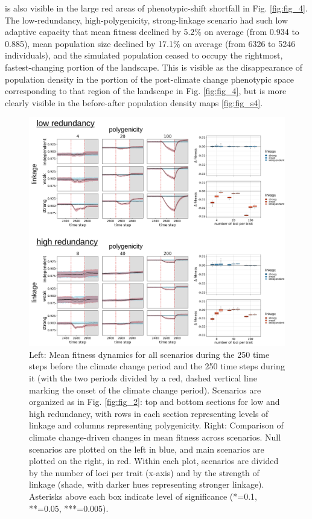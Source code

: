 \documentclass[9pt,twocolumn,twoside,lineno]{pnas-new}
\begin{document}
is also visible in the large red areas of phenotypic-shift shortfall in Fig. \ref{fig:fig_4}.
The low-redundancy, high-polygenicity, strong-linkage scenario had such low adaptive capacity
that mean fitness declined by 5.2\% on average (from 0.934 to 0.885),
mean population size declined by 17.1\% on average (from 6326 to 5246 individuals),
and the simulated population ceased to occupy the rightmost, fastest-changing portion of the landscape.
This is visible as the disappearance of population density in the portion
of the post-climate change phenotypic space corresponding to that region of the landscape in Fig. \ref{fig:fig_4},
but is more clearly visible in the before-after population density maps \ref{fig:fig_s4}.

\begin{figure}[\sidecaptionrelwidth][t]
\centering
\includegraphics[width=17.8cm]{pub/figs_and_stats/FIG_3_fit_over_time.jpg}
\caption{Left: Mean fitness dynamics for all scenarios during the 250 time steps before the climate change period and the 250 time steps during it (with the two periods divided by a red, dashed vertical line marking the onset of the climate change period). Scenarios are organized as in Fig. \ref{fig:fig_2}: top and bottom sections for low and high redundancy, with rows in each section representing levels of linkage and columns representing polygenicity. Right: Comparison of climate change-driven changes in mean fitness across scenarios. Null scenarios are plotted on the left in blue, and main scenarios are plotted on the right, in red. Within each plot, scenarios are divided by the number of loci per trait (x-axis) and by the strength of linkage (shade, with darker hues representing stronger linkage). Asterisks above each box indicate level of significance (*=0.1, **=0.05, ***=0.005).}
\label{fig:fig_3}
\end{figure}
\end{document}
